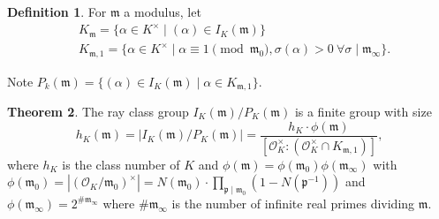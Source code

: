 \documentclass{article}
\theoremstyle{definition}
\newtheorem{theorem}{Theorem}[section]
\newtheorem{defn}[theorem]{Definition}
\begin{document}

\begin{defn}
    For $\mathfrak{m}$ a modulus, let 
    \begin{align*}
        &K_{\mathfrak{m}} = \{\alpha \in K^\times \mid (\alpha) \in I_K(\mathfrak{m})\}\\
        &K_{\mathfrak{m},1} = \{\alpha \in K^\times \mid  \alpha \equiv 1 \pmod{\mathfrak{m}_0}, \sigma(\alpha)>0 ~\forall \sigma \mid \mathfrak{m}_\infty\}.
    \end{align*}
\end{defn}
Note $P_k(\mathfrak{m}) = \{(\alpha) \in I_K(\mathfrak{m}) \mid  \alpha \in K_{\mathfrak{m},1}\}$.

\begin{theorem}
    The ray class group $I_K(\mathfrak{m})/P_K(\mathfrak{m})$ is a finite group with size \[
    h_K(\mathfrak{m}) = |I_K(\mathfrak{m})/P_K(\mathfrak{m})| = \frac{h_K \cdot \phi(\mathfrak{m})}{[\mathcal{O}_K^\times : (\mathcal{O}_K^\times \cap K_{\mathfrak{m},1})]},
    \]
    where $h_K$ is the class number of $K$ and $\phi(\mathfrak{m}) = \phi(\mathfrak{m}_0)\phi(\mathfrak{m}_{\infty})$ with $\phi(\mathfrak{m}_0) = |(\mathcal{O}_K/\mathfrak{m}_0)^\times| = N(\mathfrak{m}_0) \cdot \prod_{\mathfrak{p} \mid \mathfrak{m}_0}^{} (1-N(\mathfrak{p}^{-1}))$ and $\phi(\mathfrak{m}_{\infty}) = 2^{\# \mathfrak{m}_{\infty}}$ where $\# \mathfrak{m}_{\infty}$ is the number of infinite real primes dividing $\mathfrak{m}$.
\end{theorem}
\end{document}
